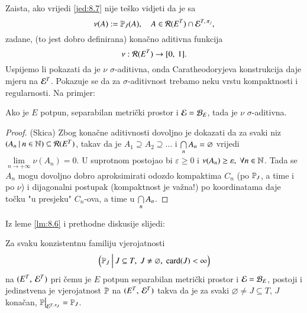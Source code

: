 Zaista, ako vrijedi \eqref{jed:8.7} nije te\v sko vidjeti da je sa
\begin{equation*}
    \nu (A) := \mathbb{P}_J (A), \quad A \in \mathcal{R}({E^T}) \cap \mathcal{E}^{T, \: \pi_j},
\end{equation*}
zadane, (to jest dobro definirana) kona\v cno aditivna funkcija
\begin{equation*}
    \nu : \mathcal{R}({E^T}) \to [{0}, \:{1}].
\end{equation*}
Uspijemo li pokazati da je $\nu$ $\sigma$-aditivna, onda Caratheodoryjeva konstrukcija daje mjeru na $\mathcal{E}^T$.
Pokazuje se da za $\sigma$-aditivnost trebamo neku vrstu kompaktnosti i regularnosti.
Na primjer:

\begin{lm}  \label{lm:8.6}
    Ako je $E$ potpun, separabilan metri\v cki prostor i $\mathcal{E} = \mathcal{B}_{E}$, tada je $\nu$ $\sigma$-aditivna.
\end{lm}

\begin{proof}{(Skica)}
    Zbog kona\v cne aditivnosti dovoljno je dokazati da za svaki niz $({A_n} \: | \: {n \in \mathbb{N}}) \subseteq \mathcal{R}({E^T})$, takav da je
    $A_1 \supseteq A_2 \supseteq \ldots$ i $\bigcap\limits_{n}^{} A_n = \varnothing$ vrijedi $\lim\limits_{n \to +\infty} \nu (A_n) = 0$.
    U suprotnom postojao bi $\varepsilon \geq 0$ i $\nu (A_n) \geq \varepsilon, \; \forall n \in \mathbb{N}$.
    Tada se $A_n$ mogu dovoljno dobro aproksimirati odozdo kompaktima $C_n$ (po $\mathbb{P}_J$, a time i po $\nu$) i dijagonalni postupak (kompaktnost je va\v zna!) po koordinatama daje to\v cku "u presjeku" $C_n$-ova, a time u $\bigcap\limits_{n}^{} A_n$.
\end{proof}

Iz leme \ref{lm:8.6} i prethodne diskusije slijedi:

\begin{tm}[Kolmogorov]    \label{tm:8.9}
    Za svaku konzistentnu familiju vjerojatnosti
    \begin{equation*}
        \Big( {\mathbb{P}_J} \: \Big| \: {J \subseteq T, \; J \neq \varnothing, \; \textnormal{card}({J}) < \infty} \Big)
    \end{equation*}
    na $({E^T}, \: {\mathcal{E}^T})$ pri \v cemu je $E$ potpun separabilan metri\v cki prostor i $\mathcal{E} = \mathcal{B}_{E}$, postoji i jedinstvena je vjerojatnost $\mathbb{P}$ na $({E^T}, \: {\mathcal{E}^T})$ takva da je za svaki $\varnothing \neq J \subseteq T$, $J$ kona\v can, $\restr{\masP}{\famE^{T, \: \pi_J}} = \masP_J$.
\end{tm}

